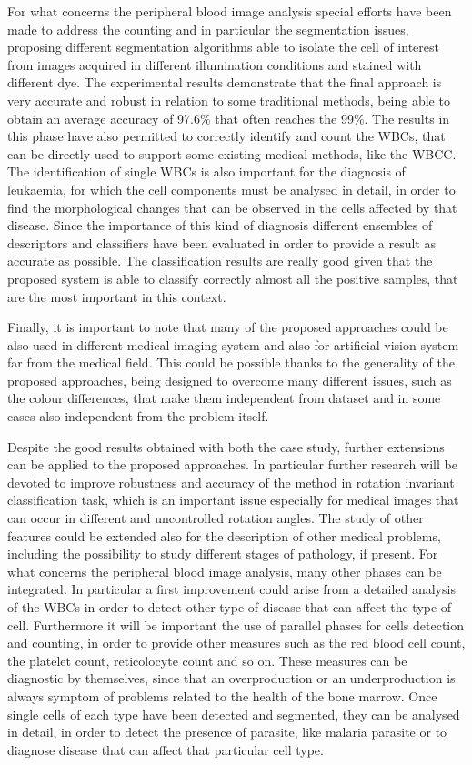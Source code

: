 \documentclass[final,a4paper,12pt,english]{UnicaPhdThesis3}
\begin{document}
For what concerns the peripheral blood image analysis special efforts have been made to address the counting and in particular the segmentation issues, proposing different segmentation algorithms able to isolate the cell of interest from images acquired in different illumination conditions and stained with different dye. The experimental results demonstrate that the final approach is very accurate and robust in relation to some traditional methods, being able to obtain an average accuracy of 97.6\% that often reaches the 99\%. The results in this phase have also permitted  to correctly identify and count the WBCs, that can be directly used to support some existing medical methods, like the WBCC. The identification of single WBCs is also important for the diagnosis of leukaemia, for which the cell components must be analysed in detail, in order to find the morphological changes that can be observed in the cells affected by that disease. Since the importance of this kind of diagnosis different ensembles of descriptors and classifiers have been evaluated in order to provide a result as accurate as possible. The classification results are really good given that the proposed system is able to classify correctly almost all the positive samples, that are the most important in this context. 

Finally, it is important to note that many of the proposed approaches could be also used in different medical imaging system and also for artificial vision system far from the medical field. This could be possible thanks to the generality of the proposed approaches, being designed to overcome many different issues, such as the colour differences, that make them independent from dataset and in some cases also independent from the problem itself.

Despite the good results obtained with both the case study, further extensions can be applied to the proposed approaches. In particular further research will be devoted to improve robustness and accuracy of the method in rotation invariant classification task, which is an important issue especially for medical images that can occur in different and uncontrolled rotation angles. The study of other features could be extended also for the description of other medical problems, including the possibility to study different stages of pathology, if present. For what concerns the peripheral blood image analysis, many other phases can be integrated. In particular a first improvement could arise from a detailed analysis of the WBCs in order to detect other type of disease that can affect the type of cell. Furthermore it will be important the use of parallel phases for cells detection and counting, in order to provide other measures such as the red blood cell count, the platelet count, reticolocyte count and so on. These measures can be diagnostic by themselves, since that an overproduction or an underproduction is always symptom of problems related to the health of the bone marrow. Once single cells of each type have been detected and segmented, they can be analysed in detail, in order to detect the presence of parasite, like malaria parasite or to diagnose disease that can affect that particular cell type.    
\end{document}
